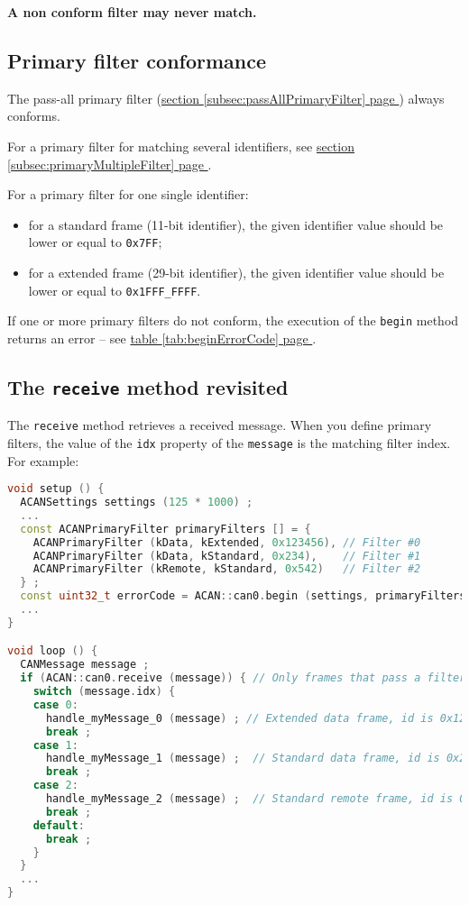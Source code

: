 \documentclass[10pt, a4paper, obeyspaces, openany]{extarticle}
\newcommand \subsectionLabel[2]{\subsection{#1}\label{subsec:#2}}
\newcommand\refSubsectionPage[1]{\hyperref[subsec:#1]{section \ref*{subsec:#1} page \pageref{subsec:#1}}}
\newcommand\refTableauPage[1]{\hyperref[tab:#1]{table \ref*{tab:#1} page \pageref{tab:#1}}}
\begin{document}
{\bf A non conform filter may never match.}




\subsectionLabel{Primary filter conformance}{primaryFilterConformance}

The pass-all primary filter (\refSubsectionPage{passAllPrimaryFilter}) always conforms.

For a primary filter for matching several identifiers, see \refSubsectionPage{primaryMultipleFilter}.

For a primary filter for one single identifier:
\begin{itemize}
  \item for a standard frame (11-bit identifier), the given identifier value should be lower or equal to \texttt{0x7FF};
  \item for a extended frame (29-bit identifier), the given identifier value should be lower or equal to \texttt{0x1FFF\_FFFF}.
\end{itemize}

If one or more primary filters do not conform, the execution of the \texttt{begin} method returns an error -- see \refTableauPage{beginErrorCode}.


\subsectionLabel{The \texttt{receive} method revisited}{usingIDXvalue}

The \texttt{receive} method retrieves a received message. When you define primary filters, the value of the \texttt{idx} property of the \texttt{message} is the matching filter index. For example:

{ \small\begin{lstlisting}[language=c++]
void setup () {
  ACANSettings settings (125 * 1000) ;
  ...
  const ACANPrimaryFilter primaryFilters [] = {
    ACANPrimaryFilter (kData, kExtended, 0x123456), // Filter #0
    ACANPrimaryFilter (kData, kStandard, 0x234),    // Filter #1
    ACANPrimaryFilter (kRemote, kStandard, 0x542)   // Filter #2
  } ;
  const uint32_t errorCode = ACAN::can0.begin (settings, primaryFilters, 3) ;
  ...
}

void loop () {
  CANMessage message ;
  if (ACAN::can0.receive (message)) { // Only frames that pass a filter are retrieved
    switch (message.idx) {
    case 0:
      handle_myMessage_0 (message) ; // Extended data frame, id is 0x123456
      break ;
    case 1:
      handle_myMessage_1 (message) ;  // Standard data frame, id is 0x234
      break ;
    case 2:
      handle_myMessage_2 (message) ;  // Standard remote frame, id is 0x542
      break ;
    default:
      break ;
    }
  }
  ...
}
\end{lstlisting}}
\end{document}
